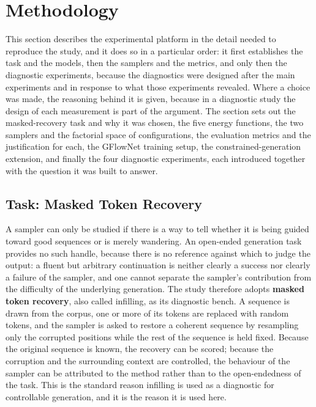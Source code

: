 \section{Methodology}
\label{ch:methodology}

This section describes the experimental platform in the detail needed to reproduce the study, and it does so in a particular order: it first establishes the task and the models, then the samplers and the metrics, and only then the diagnostic experiments, because the diagnostics were designed after the main experiments and in response to what those experiments revealed. Where a choice was made, the reasoning behind it is given, because in a diagnostic study the design of each measurement is part of the argument. The section sets out the masked-recovery task and why it was chosen, the five energy functions, the two samplers and the factorial space of configurations, the evaluation metrics and the justification for each, the GFlowNet training setup, the constrained-generation extension, and finally the four diagnostic experiments, each introduced together with the question it was built to answer.

\subsection{Task: Masked Token Recovery}
\label{sec:meth-task}

A sampler can only be studied if there is a way to tell whether it is being guided toward good sequences or is merely wandering. An open-ended generation task provides no such handle, because there is no reference against which to judge the output: a fluent but arbitrary continuation is neither clearly a success nor clearly a failure of the sampler, and one cannot separate the sampler's contribution from the difficulty of the underlying generation. The study therefore adopts \textbf{masked token recovery}, also called infilling, as its diagnostic bench. A sequence is drawn from the corpus, one or more of its tokens are replaced with random tokens, and the sampler is asked to restore a coherent sequence by resampling only the corrupted positions while the rest of the sequence is held fixed. Because the original sequence is known, the recovery can be scored; because the corruption and the surrounding context are controlled, the behaviour of the sampler can be attributed to the method rather than to the open-endedness of the task. This is the standard reason infilling is used as a diagnostic for controllable generation, and it is the reason it is used here.

